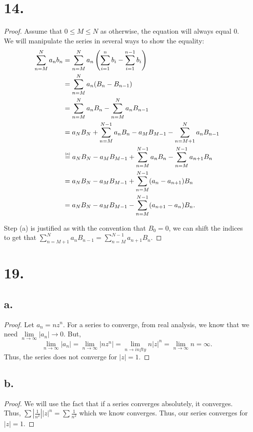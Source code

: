 \documentclass{article}
\newcommand\numeq[1]%
  {\stackrel{\scriptscriptstyle(\mkern-1.5mu#1\mkern-1.5mu)}{=}}
\begin{document}
\section*{14.}
\begin{proof}
    Assume that $0 \leq M \leq N$ as otherwise, the equation will always equal $0$. We will manipulate the series in several ways to show the equality:
    \begin{align*}
        \sum\limits_{n = M}^N a_nb_n &= \sum\limits_{n = M}^Na_n \left(\sum\limits_{i = 1}^n b_i - \sum\limits_{i = 1}^{n - 1} b_i \right) \\
        &= \sum\limits_{n = M}^N a_n (B_n - B_{n - 1}) \\
        &= \sum\limits_{n = M}^N a_n B_n - \sum\limits_{n = M}^N a_n B_{n - 1} \\
        &= a_NB_N + \sum\limits_{n = M}^{N - 1}a_n B_n - a_MB_{M - 1} - \sum\limits_{n = M + 1}^Na_nB_{n - 1} \\
        &\numeq{a} a_NB_N - a_MB_{M - 1} + \sum\limits_{n = M}^{N - 1}a_n B_n - \sum\limits_{n = M}^{N - 1}a_{n + 1}B_n \\
        &= a_NB_N - a_MB_{M - 1} + \sum\limits_{n = M}^{N - 1}(a_n - a_{n + 1}) B_n \\
        &= a_NB_N - a_MB_{M - 1} - \sum\limits_{n = M}^{N - 1}(a_{n + 1} - a_n)B_n. 
    \end{align*}


    Step (a) is justified as with the convention that $B_0 = 0$, we can shift the indices to get that $\sum\limits_{n = M + 1}^Na_nB_{n - 1} = \sum\limits_{n = M}^{N - 1}a_{n + 1}B_n$. 
\end{proof}

\section*{19.}
\subsection*{a.}
\begin{proof}
Let $a_n = nz^n$. For a series to converge, from real analysis, we know that we need $\lim\limits_{n \to \infty} |a_n| \to 0$. But, \[\lim\limits_{n \to \infty} |a_n| = \lim\limits_{n \to \infty} |nz^n| = \lim\limits_{n \to infty} n |z|^n = \lim\limits_{n \to \infty} n = \infty. \] 
Thus, the series does not converge for $|z| = 1$. 
\end{proof}

\subsection*{b.}
\begin{proof}
    We will use the fact that if a series converges absolutely, it converges. Thus, $\sum\left|\frac{1}{n^2} \right||z|^n = \sum\frac{1}{n^2}$ which we know converges. 
    Thus, our series converges for $|z| = 1$. 
\end{proof}
\end{document}
